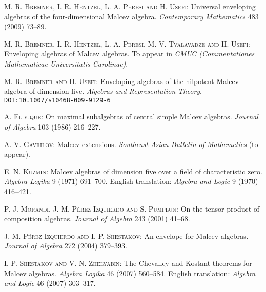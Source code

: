 \documentclass{amsart}
\theoremstyle{plain}
\theoremstyle{definition}
\begin{document}
\begin{thebibliography}{9}

  \textsc{M. R. Bremner, I. R. Hentzel, L. A. Peresi and H. Usefi}:
  Universal enveloping algebras of the four-dimensional Malcev algebra.
  \emph{Contemporary Mathematics} 483 (2009) 73--89.

  \textsc{M. R. Bremner, I. R. Hentzel, L. A. Peresi, M. V. Tvalavadze and H. Usefi}:
  Enveloping algebras of Malcev algebras.
  To appear in
  \emph{CMUC (Commentationes Mathematicae Universitatis Carolinae)}.

  \textsc{M. R. Bremner and H. Usefi}:
  Enveloping algebras of the nilpotent Malcev algebra of dimension five.
  \emph{Algebras and Representation Theory}.
  \texttt{DOI:10.1007/s10468-009-9129-6}

  \textsc{A. Elduque}:
  On maximal subalgebras of central simple Malcev algebras.
  \emph{Journal of Algebra}
  103 (1986) 216--227.

  \textsc{A. V. Gavrilov}:
  Malcev extensions.
  \emph{Southeast Asian Bulletin of Mathemetics}
  (to appear).

  \textsc{E. N. Kuzmin}:
  Malcev algebras of dimension five over a field of characteristic zero.
  \emph{Algebra Logika}
  9 (1971) 691--700.
  English translation:
  \emph{Algebra and Logic}
  9 (1970) 416--421.

  \textsc{P. J. Morandi, J. M. P\'erez-Izquierdo and S. Pumpl\"un}:
  On the tensor product of composition algebras.
  \emph{Journal of Algebra}
  243 (2001) 41--68.

  \textsc{J.-M. P\'erez-Izquierdo and I. P. Shestakov}:
  An envelope for Malcev algebras.
  \emph{Journal of Algebra}
  272 (2004) 379--393.

  \textsc{I. P. Shestakov and V. N. Zhelyabin}:
  The Chevalley and Kostant theorems for Malcev algebras.
  \emph{Algebra Logika} 46 (2007) 560--584.
  English translation:
  \emph{Algebra and Logic}
  46 (2007) 303--317.

\end{thebibliography}
\end{document}
